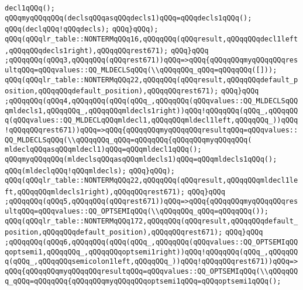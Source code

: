 \verb|decl1qQQq();|\newline
\verb|qQQqmyqQQqqQQq(declsqQQqasqQQqdecls1)qQQq=qQQqdecls1qQQq();|\newline
\verb|qQQq(declqQQq!qQQqdecls);|\newline
\verb|qQQq}qQQq);|\newline
\verb|qQQq(qQQqlr_table::NONTERMqQQq16,qQQqqQQq(qQQqresult,qQQqqQQqdecl1left,qQQqqQQqdecls1right),qQQqqQQqrest671);|\newline
\verb|qQQq}qQQq|\newline
\verb|;qQQqqQQq(qQQq3,qQQqqQQq(qQQqrest671))qQQq=>qQQq{qQQqqQQqmyqQQqqQQqresultqQQq=qQQqvalues::QQ_MLDECLSqQQq(\\qQQqqQQq_qQQq=qQQqqQQq([]));|\newline
\verb|qQQq(qQQqlr_table::NONTERMqQQq22,qQQqqQQq(qQQqresult,qQQqqQQqdefault_position,qQQqqQQqdefault_position),qQQqqQQqrest671);|\newline
\verb|qQQq}qQQq|\newline
\verb|;qQQqqQQq(qQQq4,qQQqqQQq(qQQq(qQQq_,qQQqqQQq(qQQqvalues::QQ_MLDECLSqQQqmldecls1,qQQqqQQq_,qQQqqQQqmldecls1right))qQQq!qQQqqQQq(qQQq_,qQQqqQQq(qQQqvalues::QQ_MLDECLqQQqmldecl1,qQQqqQQqmldecl1left,qQQqqQQq_))qQQq!qQQqqQQqrest671))qQQq=>qQQq{qQQqqQQqmyqQQqqQQqresultqQQq=qQQqvalues::QQ_MLDECLSqQQq(\\qQQqqQQq_qQQq=qQQqqQQq{qQQqqQQqmyqQQqqQQq(|\newline
\verb|mldeclqQQqasqQQqmldecl1)qQQq=qQQqmldecl1qQQq();|\newline
\verb|qQQqmyqQQqqQQq(mldeclsqQQqasqQQqmldecls1)qQQq=qQQqmldecls1qQQq();|\newline
\verb|qQQq(mldeclqQQq!qQQqmldecls);|\newline
\verb|qQQq}qQQq);|\newline
\verb|qQQq(qQQqlr_table::NONTERMqQQq22,qQQqqQQq(qQQqresult,qQQqqQQqmldecl1left,qQQqqQQqmldecls1right),qQQqqQQqrest671);|\newline
\verb|qQQq}qQQq|\newline
\verb|;qQQqqQQq(qQQq5,qQQqqQQq(qQQqrest671))qQQq=>qQQq{qQQqqQQqmyqQQqqQQqresultqQQq=qQQqvalues::QQ_OPTSEMIqQQq(\\qQQqqQQq_qQQq=qQQqqQQq());|\newline
\verb|qQQq(qQQqlr_table::NONTERMqQQq172,qQQqqQQq(qQQqresult,qQQqqQQqdefault_position,qQQqqQQqdefault_position),qQQqqQQqrest671);|\newline
\verb|qQQq}qQQq|\newline
\verb|;qQQqqQQq(qQQq6,qQQqqQQq(qQQq(qQQq_,qQQqqQQq(qQQqvalues::QQ_OPTSEMIqQQqoptsemi1,qQQqqQQq_,qQQqqQQqoptsemi1right))qQQq!qQQqqQQq(qQQq_,qQQqqQQq(qQQq_,qQQqqQQqsemicolon1left,qQQqqQQq_))qQQq!qQQqqQQqrest671))qQQq=>qQQq{qQQqqQQqmyqQQqqQQqresultqQQq=qQQqvalues::QQ_OPTSEMIqQQq(\\qQQqqQQq_qQQq=qQQqqQQq{qQQqqQQqmyqQQqqQQqoptsemi1qQQq=qQQqoptsemi1qQQq();|\newline
